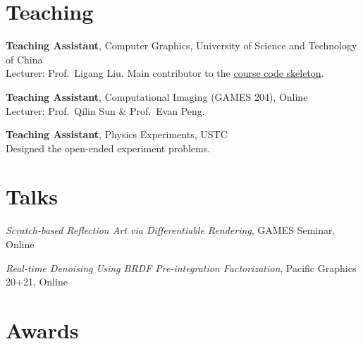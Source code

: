 \documentclass[11pt,a4paper]{article}
\begin{document}
\section*{Teaching}

\begin{tablist}
    \item[2024] \tab{}\textbf{Teaching Assistant}, Computer Graphics, University of Science and Technology of China \\
                  \hspace{1em}Lecturer: Prof.\ Ligang Liu. Main contributor to the
                  \href{https://github.com/USTC-CG/USTC_CG_24}{course code skeleton}.
    \item[2022] \tab{}\textbf{Teaching Assistant}, Computational Imaging (GAMES 204), Online \\
                  \hspace{1em}Lecturer: Prof.\ Qilin Sun \& Prof.\ Evan Peng.
    \item[2020--21] \tab{}\textbf{Teaching Assistant}, Physics Experiments, USTC \\
                  \hspace{1em}Designed the open-ended experiment problems.
\end{tablist}

\section*{Talks}

\begin{tablist}
    \item[2023] \tab{}\textit{Scratch-based Reflection Art via Differentiable Rendering}, GAMES Seminar, Online
    \item[2020] \tab{}\textit{Real-time Denoising Using BRDF Pre-integration Factorization}, Pacific Graphics 20+21, Online
\end{tablist}

\section*{Awards}
\end{document}
